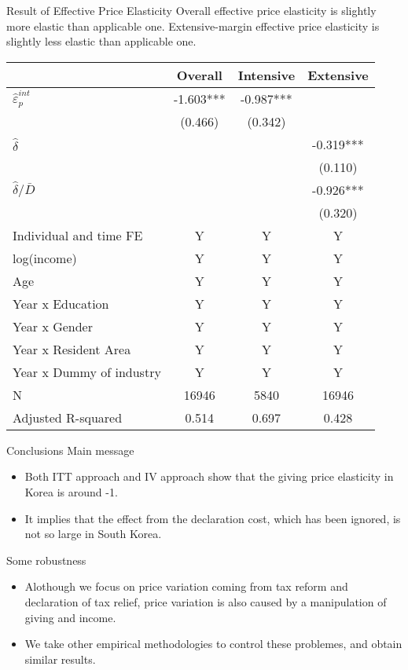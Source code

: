 \documentclass[
  ignorenonframetext,
  aspectratio=169,
]{beamer}
\providecommand{\tightlist}{%
  \setlength{\itemsep}{0pt}\setlength{\parskip}{0pt}}
\begin{document}
\begin{frame}{Result of Effective Price Elasticity}
\protect\hypertarget{result-of-effective-price-elasticity}{}
Overall effective price elasticity is slightly more elastic than applicable one. Extensive-margin effective price elasticity is slightly less elastic than applicable one.

\begin{table}
\centering\begingroup\fontsize{8}{10}\selectfont

\begin{tabular}{lccc}
\toprule
 & Overall & Intensive & Extensive\\
\midrule
$\hat{\varepsilon}_p^{int}$ & -1.603*** & -0.987*** & \\
 & (0.466) & (0.342) & \\
$\hat{\delta}$ &  &  & -0.319***\\
 &  &  & (0.110)\\
$\hat{\delta}/\bar{D}$ &  &  & -0.926***\\
 &  &  & (0.320)\\
Individual and time FE & Y & Y & Y\\
log(income) & Y & Y & Y\\
Age & Y & Y & Y\\
Year x Education & Y & Y & Y\\
Year x Gender & Y & Y & Y\\
Year x Resident Area & Y & Y & Y\\
Year x Dummy of industry & Y & Y & Y\\
N & 16946 & 5840 & 16946\\
Adjusted R-squared & 0.514 & 0.697 & 0.428\\
\bottomrule
\end{tabular}
\endgroup{}
\end{table}
\end{frame}

\begin{frame}{Conclusions}
\protect\hypertarget{conclusions}{}
Main message

\begin{itemize}
\tightlist
\item
  Both ITT approach and IV approach show that the giving price elasticity in Korea is around -1.
\item
  It implies that the effect from the declaration cost, which has been ignored, is not so large in South Korea.
\end{itemize}

Some robustness

\begin{itemize}
\tightlist
\item
  Alothough we focus on price variation coming from tax reform and declaration of tax relief, price variation is also caused by a manipulation of giving and income.
\item
  We take other empirical methodologies to control these problemes, and obtain similar results.
\end{itemize}
\end{frame}
\end{document}
